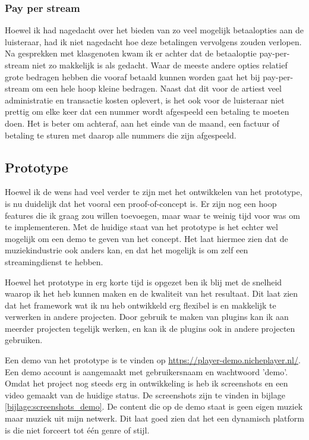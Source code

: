 

\subsubsection*{Pay per stream}
Hoewel ik had nagedacht over het bieden van zo veel mogelijk betaalopties aan de luisteraar, had ik niet nagedacht hoe deze betalingen vervolgens zouden verlopen. Na gesprekken met klasgenoten kwam ik er achter dat de betaaloptie pay-per-stream niet zo makkelijk is als gedacht. Waar de meeste andere opties relatief grote bedragen hebben die vooraf betaald kunnen worden gaat het bij pay-per-stream om een hele hoop kleine bedragen. Naast dat dit voor de artiest veel administratie en transactie kosten oplevert, is het ook voor de luisteraar niet prettig om elke keer dat een nummer wordt afgespeeld een betaling te moeten doen. Het is beter om achteraf, aan het einde van de maand, een factuur of betaling te sturen met daarop alle nummers die zijn afgespeeld.


\subsection{Prototype}
Hoewel ik de wens had veel verder te zijn met het ontwikkelen van het prototype, is nu duidelijk dat het vooral een proof-of-concept is. Er zijn nog een hoop features die ik graag zou willen toevoegen, maar waar te weinig tijd voor was om te implementeren. Met de huidige staat van het prototype is het echter wel mogelijk om een demo te geven van het concept. Het laat hiermee zien dat de muziekindustrie ook anders kan, en dat het mogelijk is om zelf een streamingdienst te hebben.

Hoewel het prototype in erg korte tijd is opgezet ben ik blij met de snelheid waarop ik het heb kunnen maken en de kwaliteit van het resultaat. Dit laat zien dat het framework wat ik nu heb ontwikkeld erg flexibel is en makkelijk te verwerken in andere projecten. Door gebruik te maken van plugins kan ik aan meerder projecten tegelijk werken, en kan ik de plugins ook in andere projecten gebruiken.

Een demo van het prototype is te vinden op \url{https://player-demo.nicheplayer.nl/}. Een demo account is aangemaakt met gebruikersnaam en wachtwoord 'demo'. Omdat het project nog steeds erg in ontwikkeling is heb ik screenshots en een video gemaakt van de huidige status. De screenshots zijn te vinden in bijlage \ref{bijlage:screenshots_demo}. De content die op de demo staat is geen eigen muziek maar muziek uit mijn netwerk. Dit laat goed zien dat het een dynamisch platform is die niet forceert tot één genre of stijl.

